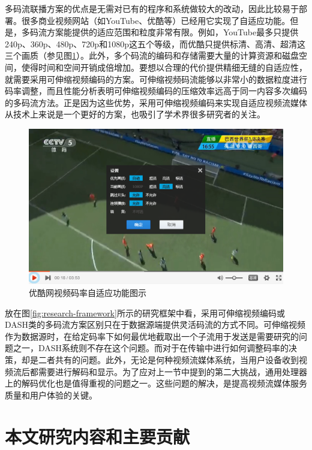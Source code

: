 多码流联播方案的优点是无需对已有的程序和系统做较大的改动，因此比较易于部署\supercite{Bouten2014}。很多商业视频网站（如YouTube、优酷等）已经用它实现了自适应功能。但是，多码流方案能提供的适应范围和粒度非常有限。例如，YouTube最多只提供240p、360p、480p、720p和1080p这五个等级，而优酷只提供标清、高清、超清这三个画质（参见图\ref{fig:13}）。此外，多个码流的编码和存储需要大量的计算资源和磁盘空间，使得时间和空间开销成倍增加。要想以合理的代价提供精细无缝的自适应性，就需要采用可伸缩视频编码的方案。可伸缩视频码流能够以非常小的数据粒度进行码率调整，而且性能分析表明可伸缩视频编码的压缩效率远高于同一内容多次编码的多码流方法\supercite{SVC-Performance}。正是因为这些优势，采用可伸缩视频编码来实现自适应视频流媒体从技术上来说是一个更好的方案，也吸引了学术界很多研究者的关注\supercite{Chuah2012, Zhu2013, Dan2013, Yang2014, Cicalo2014}。

\begin{figure}[h]
	\centering
	\includegraphics[width = 1.0\linewidth]{clip/13.png}
	\caption{优酷网视频码率自适应功能图示\label{fig:13}}
\end{figure}

放在图\ref{fig:research-framework}所示的研究框架中看，采用可伸缩视频编码或DASH类的多码流方案区别只在于数据源端提供灵活码流的方式不同。可伸缩视频作为数据源时，在给定码率下如何最优地截取出一个子流用于发送是需要研究的问题之一，DASH系统则不存在这个问题。而对于在传输中进行如何调整码率的决策，却是二者共有的问题。此外，无论是何种视频流媒体系统，当用户设备收到视频流后都需要进行解码和显示。为了应对上一节中提到的第二大挑战，通用处理器上的解码优化也是值得重视的问题之一。这些问题的解决，是提高视频流媒体服务质量和用户体验的关键。

\section{本文研究内容和主要贡献}

